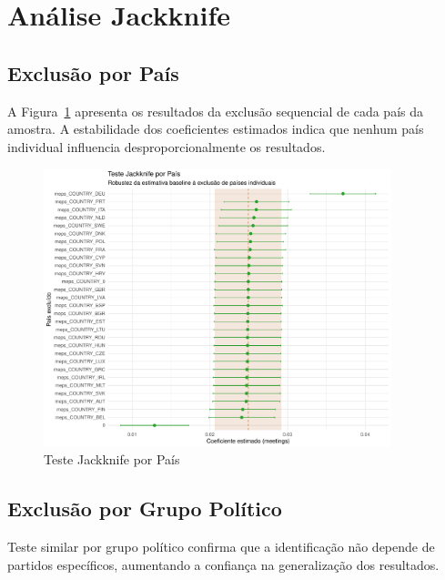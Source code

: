 \section{Análise Jackknife}

\subsection{Exclusão por País}

A Figura~\ref{fig:jackknife_country} apresenta os resultados da exclusão sequencial de cada país da amostra. A estabilidade dos coeficientes estimados indica que nenhum país individual influencia desproporcionalmente os resultados.

\begin{figure}[htbp]
    \centering
    \includegraphics[width=0.9\textwidth]{figures/robustness/jackknife_country.pdf}
    \caption{Teste Jackknife por País}
    \label{fig:jackknife_country}
\end{figure}

\subsection{Exclusão por Grupo Político}

Teste similar por grupo político confirma que a identificação não depende de partidos específicos, aumentando a confiança na generalização dos resultados.

